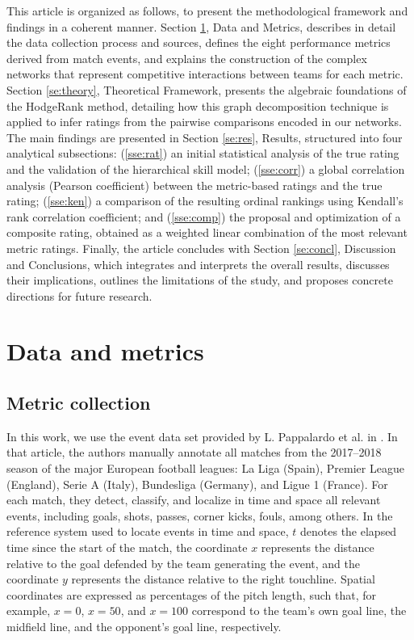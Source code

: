 \documentclass[preprint, amsmath,amssymb, pre]{revtex4-2}
\begin{document}
This article is organized as follows, to present the methodological framework and findings in a coherent manner. Section \ref{se:dym},  Data and Metrics, describes in detail the data collection process and sources, defines the eight performance metrics derived from match events, and explains the construction of the complex networks that represent competitive interactions between teams for each metric. Section \ref{se:theory}, Theoretical Framework, presents the algebraic foundations of the HodgeRank method, detailing how this graph decomposition technique is applied to infer ratings from the pairwise comparisons encoded in our networks. The main findings are presented in Section \ref{se:res}, Results, structured into four analytical subsections: (\ref{sse:rat}) an initial statistical analysis of the true rating and the validation of the hierarchical skill model; (\ref{sse:corr}) a global correlation analysis (Pearson coefficient) between the metric-based ratings and the true rating; (\ref{sse:ken}) a comparison of the resulting ordinal rankings using Kendall’s rank correlation coefficient; and (\ref{sse:comp}) the proposal and optimization of a composite rating, obtained as a weighted linear combination of the most relevant metric ratings. Finally, the article concludes with Section \ref{se:concl}, Discussion and Conclusions, which integrates and interprets the overall results, discusses their implications, outlines the limitations of the study, and proposes concrete directions for future research.

\section{Data and metrics}
\label{se:dym}

\subsection{Metric collection}
\label{se:metricas}

In this work, we use the event data set provided by L. Pappalardo et al. in \cite{pappalardo2019public}.  
In that article, the authors manually annotate all matches from the 2017--2018 season of the major European football leagues: La Liga (Spain), Premier League (England), Serie A (Italy), Bundesliga (Germany), and Ligue 1 (France). For each match, they detect, classify, and localize in time and space all relevant events, including goals, shots, passes, corner kicks, fouls, among others.  
%
In the reference system used to locate events in time and space, $t$ denotes the elapsed time since the start of the match, the coordinate $x$ represents the distance relative to the goal defended by the team generating the event, and the coordinate $y$ represents the distance relative to the right touchline. Spatial coordinates are expressed as percentages of the pitch length, such that, for example, $x=0$, $x=50$, and $x=100$ correspond to the team’s own goal line, the midfield line, and the opponent’s goal line, respectively.
\end{document}
